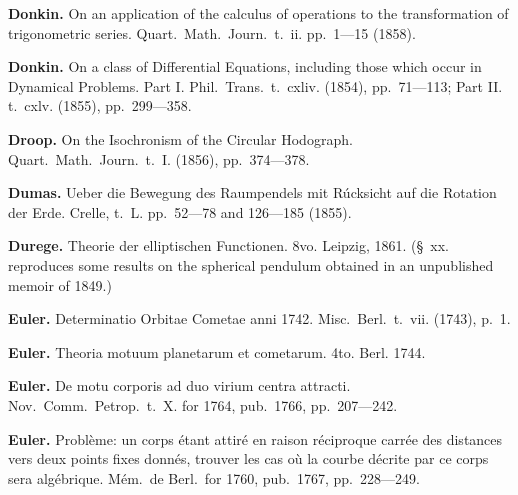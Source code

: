 \documentclass[11pt,a4paper]{book}
\begin{document}
\vspace{0.5em}

\noindent\textbf{Donkin.} On an application of the calculus of operations to the transformation of trigonometric series. Quart.~Math.~Journ.~t.~ii. pp.~1---15 (1858).

\vspace{0.5em}

\noindent\textbf{Donkin.} On a class of Differential Equations, including those which occur in Dynamical Problems. Part I. Phil.~Trans.~t.~cxliv. (1854), pp.~71---113; Part II. t.~cxlv. (1855), pp.~299---358.

\vspace{0.5em}

\noindent\textbf{Droop.} On the Isochronism of the Circular Hodograph. Quart.~Math.~Journ.~t.~I. (1856), pp.~374---378.

\vspace{0.5em}

\noindent\textbf{Dumas.} Ueber die Bewegung des Raumpendels mit R\'{u}cksicht auf die Rotation der Erde. Crelle, t.~L. pp.~52---78 and 126---185 (1855).

\vspace{0.5em}

\noindent\textbf{Durege.} Theorie der elliptischen Functionen. 8vo. Leipzig, 1861. (\S~xx. reproduces some results on the spherical pendulum obtained in an unpublished memoir of 1849.)

\vspace{0.5em}

\noindent\textbf{Euler.} Determinatio Orbitae Cometae anni 1742. Misc.~Berl.~t.~vii. (1743), p.~1.

\vspace{0.5em}

\noindent\textbf{Euler.} Theoria motuum planetarum et cometarum. 4to. Berl. 1744.

\vspace{0.5em}

\noindent\textbf{Euler.} De motu corporis ad duo virium centra attracti. Nov.~Comm.~Petrop.~t.~X. for 1764, pub.~1766, pp.~207---242.

\vspace{0.5em}

\noindent\textbf{Euler.} Probl\`{e}me: un corps \'{e}tant attir\'{e} en raison r\'{e}ciproque carr\'{e}e des distances vers deux points fixes donn\'{e}s, trouver les cas o\`{u} la courbe d\'{e}crite par ce corps sera alg\'{e}brique. M\'{e}m.~de Berl.~for 1760, pub.~1767, pp.~228---249.
\end{document}
